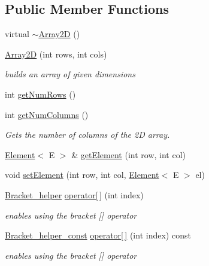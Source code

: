 \subsection*{Public Member Functions}
\begin{DoxyCompactItemize}
\item 
virtual \hyperlink{classbridges_1_1datastructure_1_1_array2_d_a6ec24f33b8420735ac7545956afc6dab}{$\sim$\+Array2D} ()
\item 
\hyperlink{classbridges_1_1datastructure_1_1_array2_d_ad65bbb54e829788fee9563a67ffa309c}{Array2D} (int rows, int cols)
\begin{DoxyCompactList}\small\item\em builds an array of given dimensions \end{DoxyCompactList}\item 
int \hyperlink{classbridges_1_1datastructure_1_1_array2_d_afb18017e8a49c0579a90cf22b6dc4c9e}{get\+Num\+Rows} ()
\item 
int \hyperlink{classbridges_1_1datastructure_1_1_array2_d_a0a33557d828d9617871c62a7522817ed}{get\+Num\+Columns} ()
\begin{DoxyCompactList}\small\item\em Gets the number of columns of the 2D array. \end{DoxyCompactList}\item 
\hyperlink{classbridges_1_1datastructure_1_1_element}{Element}$<$ E $>$ \& \hyperlink{classbridges_1_1datastructure_1_1_array2_d_afaa0bcbf06170929d92659314ff2b38d}{get\+Element} (int row, int col)
\item 
void \hyperlink{classbridges_1_1datastructure_1_1_array2_d_a2bd2ef3a200e4a07a4d45534bd31387d}{set\+Element} (int row, int col, \hyperlink{classbridges_1_1datastructure_1_1_element}{Element}$<$ E $>$ el)
\item 
\hyperlink{structbridges_1_1datastructure_1_1_array2_d_1_1_bracket__helper}{Bracket\+\_\+helper} \hyperlink{classbridges_1_1datastructure_1_1_array2_d_a38dfa405595de87a9730c3a951fb85ef}{operator\mbox{[}$\,$\mbox{]}} (int index)
\begin{DoxyCompactList}\small\item\em enables using the bracket \mbox{[}\mbox{]} operator \end{DoxyCompactList}\item 
\hyperlink{structbridges_1_1datastructure_1_1_array2_d_1_1_bracket__helper__const}{Bracket\+\_\+helper\+\_\+const} \hyperlink{classbridges_1_1datastructure_1_1_array2_d_a427adc67a85ec12e765199448ac82ec2}{operator\mbox{[}$\,$\mbox{]}} (int index) const
\begin{DoxyCompactList}\small\item\em enables using the bracket \mbox{[}\mbox{]} operator \end{DoxyCompactList}\end{DoxyCompactItemize}
